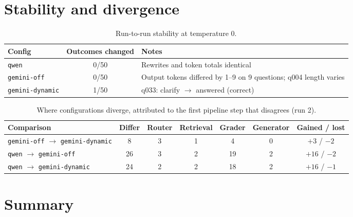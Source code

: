\documentclass[11pt]{article}
\newcommand{\cfg}[1]{\texttt{#1}}
\begin{document}
\section{Stability and divergence}

\begin{table}[h]
\centering
\caption{Run-to-run stability at temperature 0.}
\label{tab:stability}
\begin{tabular}{@{}lcp{8.5cm}@{}}
\toprule
Config & Outcomes changed & Notes \\
\midrule
\cfg{qwen}           & 0/50 & Rewrites and token totals identical \\
\cfg{gemini-off}     & 0/50 & Output tokens differed by 1--9 on 9 questions; q004 length varies \\
\cfg{gemini-dynamic} & 1/50 & q033: clarify $\rightarrow$ answered (correct) \\
\bottomrule
\end{tabular}
\end{table}

\begin{table}[h]
\centering
\caption{Where configurations diverge, attributed to the first pipeline step that disagrees (run 2).}
\label{tab:divergence}
\begin{tabular}{@{}lcccccc@{}}
\toprule
Comparison & Differ & Router & Retrieval & Grader & Generator & Gained / lost \\
\midrule
\cfg{gemini-off} $\rightarrow$ \cfg{gemini-dynamic} & 8  & 3 & 1 & 4  & 0 & $+3$ / $-2$ \\
\cfg{qwen} $\rightarrow$ \cfg{gemini-off}           & 26 & 3 & 2 & 19 & 2 & $+16$ / $-2$ \\
\cfg{qwen} $\rightarrow$ \cfg{gemini-dynamic}       & 24 & 2 & 2 & 18 & 2 & $+16$ / $-1$ \\
\bottomrule
\end{tabular}
\end{table}

\section{Summary}
\end{document}
